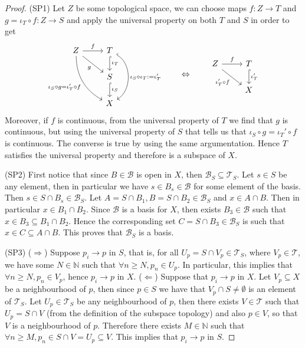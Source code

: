 \begin{proof}
  (SP1) Let \(Z\) be some topological space, we can choose maps \(f: Z \to T\)
  and \(g = \iota_T \circ f : Z \to S\) and apply the universal property on both
  \(T\) and \(S\) in order to get
  \[
    \begin{tikzcd}
      Z \ar[r,"f"]
      \ar[rd, swap, "g"]
      \ar[rdd, swap, bend right,
      "\iota_S \circ g = \iota_T' \circ f"]
        &T \ar[d, hook, "\iota_T"]
        \ar[dd, hook, bend left = 60, "\iota_S \circ \iota_T := \iota_T'"]\\
        &S \ar[d, hook, "\iota_S"] \\
        &X
    \end{tikzcd}
    \qquad \Leftrightarrow \qquad
    \begin{tikzcd}
      Z \ar[dr, swap, "\iota_T' \circ f"] \ar[r, "f"]
        &T \ar[d, hook, "\iota_T'"] \\
        &X
    \end{tikzcd}
  \]
  Moreover, if \(f\) is continuous, from the universal property of \(T\) we find
  that \(g\) is continuous, but using the universal property of \(S\) that tells
  us that \(\iota_S \circ g = \iota_T' \circ f\) is continuous. The converse is
  true by using the same argumentation. Hence \(T\) satisfies the universal
  property and therefore is a subspace of \(X\).

  (SP2) First notice that since \(B \in \mathcal B\) is open in \(X\), then
  \(\mathcal B_S \subseteq \mathcal T_S\). Let \(s \in S\) be any element, then
  in particular we have \(s \in B_s \in \mathcal B\) for some element of the
  basis. Then \(s \in S \cap B_s \in \mathcal B_S\). Let \(A = S \cap B_1, B = S
  \cap B_2 \in \mathcal B_S\) and \(x \in A \cap B\). Then in particular \(x \in
  B_1 \cap B_2\). Since \(\mathcal B\) is a basis for \(X\), then exists \(B_3
  \in \mathcal B\) such that \(x \in B_3 \subseteq B_1 \cap B_2\). Hence the
  corresponding set \(C = S \cap B_3 \in \mathcal B_S\) is such that \(x \in C
  \subseteq A \cap B\). This proves that \(\mathcal B_S\) is a basis.

  (SP3) (\(\Rightarrow\)) Suppose \(p_i \to p\) in \(S\), that is, for all \(U_p
  = S \cap V_p \in \mathcal T_S\), where \(V_p \in \mathcal T\), we have some
  \(N \in \mathbb{N}\) such that \(\forall n \geq N, p_n \in U_p\). In
  particular, this implies that \(\forall n \geq N, p_n \in V_p\), hence \(p_i
  \to p\) in \(X\).
  (\(\Leftarrow\)) Suppose that \(p_i \to p\) in \(X\). Let \(V_p \subseteq X\)
  be a neighbourhood of \(p\), then since \(p \in S\) we have that \(V_p \cap S
  \neq \emptyset\) is an element of \(\mathcal T_S\). Let \(U_p \in
  \mathcal T_S\) be any neighbourhood of \(p\), then there exists \(V \in
  \mathcal T\) such that \(U_p = S \cap V\) (from the definition of the subspace
  topology) and also \(p \in V\), so that \(V\) is a neighbourhood of \(p\).
  Therefore there exists \(M \in \mathbb{N}\) such that \(\forall n \geq M, p_n
  \in S \cap V = U_p \subseteq V\). This implies that \(p_i \to p\) in \(S\).


\end{proof}
